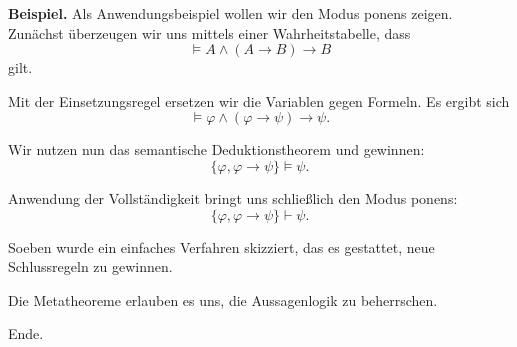 \documentclass{beamer}
\newcommand{\strong}[1]{\textsf{\textbf{#1}}}
\begin{document}
\begin{frame}
\strong{Beispiel.}
Als Anwendungsbeispiel wollen wir den Modus ponens zeigen.
Zunächst überzeugen wir uns mittels einer Wahrheitstabelle, dass
\[\models A\land (A\rightarrow B)\rightarrow B\]
gilt.
\end{frame}

\begin{frame}
Mit der Einsetzungsregel ersetzen wir die Variablen gegen Formeln.
Es ergibt sich
\[\models\varphi\land (\varphi\rightarrow\psi)\rightarrow\psi.\]
\end{frame}

\begin{frame}
Wir nutzen nun das semantische Deduktionstheorem und
gewinnen:
\[\{\varphi,\varphi\rightarrow\psi\}\models\psi.\]
\end{frame}

\begin{frame}
Anwendung der Vollständigkeit bringt uns schließlich
den Modus ponens:
\[\{\varphi,\varphi\rightarrow\psi\}\vdash\psi.\]
\end{frame}

\begin{frame}
Soeben wurde ein einfaches Verfahren skizziert, das es gestattet, neue
Schlussregeln zu gewinnen.
\end{frame}

\begin{frame}
Die Metatheoreme erlauben es uns, die Aussagenlogik zu beherrschen.
\end{frame}

\begin{frame}
Ende.
\end{frame}
\end{document}
